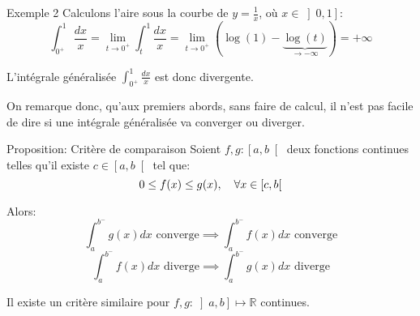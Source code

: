 \documentclass[a4paper]{article}
\begin{document}
\begin{parag}{Exemple 2}
    Calculons l'aire sous la courbe de $y = \frac{1}{x}$, où $x \in \left]0, 1\right] $:
    \[\int_{0^+}^{1} \frac{dx}{x} = \lim_{t \to 0^+} \int_{t}^{1} \frac{dx}{x} = \lim_{t \to 0^+} \left(\log\left(1\right) - \underbrace{\log\left(t\right)}_{\to -\infty}\right) = +\infty\]

    L'intégrale généralisée $\int_{0^+}^{1} \frac{dx}{x}$ est donc divergente.

    On remarque donc, qu'aux premiers abords, sans faire de calcul, il n'est pas facile de dire si une intégrale généralisée va converger ou diverger.
\end{parag}

\begin{parag}{Proposition: Critère de comparaison}
    Soient $f, g : \left[a, b\right[ $ deux fonctions continues telles qu'il existe $c \in \left[a, b\right[ $ tel que:
    \[0 \leq f\left(x\right) \leq g\left(x\right), \mathspace \forall x \in \left[c, b\right[ \]

    Alors:
    \[\int_{a}^{b^-} g\left(x\right)dx \text{ converge} \implies \int_{a}^{b^-} f\left(x\right)dx \text{ converge} \]
    \[\int_{a}^{b^-} f\left(x\right)dx \text{ diverge} \implies \int_{a}^{b^-} g\left(x\right)dx \text{ diverge} \]

    Il existe un critère similaire pour $f, g : \left]a, b\right] \mapsto \mathbb{R}$ continues.
\end{parag}
\end{document}
